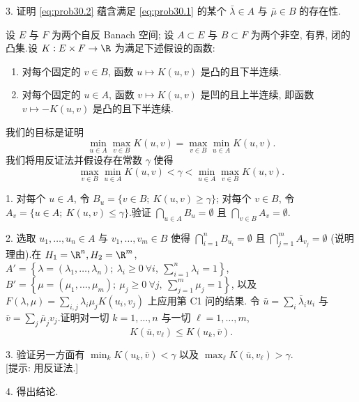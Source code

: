 \begin{problem}[第 3, 5 章]
3. 证明 \eqref{eq:prob30.2} 蕴含满足 \eqref{eq:prob30.1} 的某个 $\bar\lambda\in A$
与 $\bar\mu\in B$ 的存在性.


设 $E$ 与 $F$ 为两个自反 Banach 空间; 设 $A\subset E$ 与 $B\subset F$ 为两个非空, 有界, 闭的凸集.设 $K:E\times F\to\R$ 为满足下述假设的函数:
\begin{enumerate}[label=(\alph*), itemsep=0.1em]
	\item 对每个固定的 $v\in B$, 函数 $u\mapsto K(u,v)$ 是凸的且下半连续.
	\item 对每个固定的 $u\in A$, 函数 $v\mapsto K(u,v)$ 是凹的且上半连续, 即函数 $v\mapsto-K(u,v)$ 是凸的且下半连续.
\end{enumerate}
我们的目标是证明
\begin{equation*}
\min_{u\in A}\max_{v\in B}K(u,v)=\max_{v\in B}\min_{u\in A}K(u,v).
\end{equation*}
我们将用反证法并假设存在常数 $\gamma$ 使得
\begin{equation*}
\max_{v\in B}\min_{u\in A}K(u,v)<\gamma<\min_{u\in A}\max_{v\in B}K(u,v).
\end{equation*}

1. 对每个 $u\in A$, 令 $B_u=\{v\in B;\ K(u,v)\ge\gamma\}$; 对每个 $v\in B$, 令
$A_v=\{u\in A;\ K(u,v)\le\gamma\}$.验证 $\bigcap_{u\in A}B_u=\emptyset$ 且
$\bigcap_{v\in B}A_v=\emptyset$.

2. 选取 $u_1,\dots,u_n\in A$ 与 $v_1,\dots,v_m\in B$ 使得 $\bigcap_{i=1}^nB_{u_i}=\emptyset$
且 $\bigcap_{j=1}^mA_{v_j}=\emptyset$ (说明理由).在 $H_1=\R^n,H_2=\R^m$,
$A'=\left\{\lambda=(\lambda_1,\dots,\lambda_n);\ \lambda_i\ge0\ \forall i,\ \sum_{i=1}^n\lambda_i=1\right\}$,
$B'=\left\{\mu=(\mu_1,\dots,\mu_m);\ \mu_j\ge0\ \forall j,\ \sum_{j=1}^m\mu_j=1\right\}$,
以及 $F(\lambda,\mu)=\sum_{i,j}\lambda_i\mu_jK(u_i,v_j)$ 上应用第 C1 问的结果.
令 $\bar u=\sum_i\bar\lambda_iu_i$ 与 $\bar v=\sum_j\bar\mu_jv_j$.证明对一切
$k=1,\dots,n$ 与一切 $\ell=1,\dots,m$,
\begin{equation*}
K(\bar u,v_\ell)\le K(u_k,\bar v).
\end{equation*}

3. 验证另一方面有 $\min_k K(u_k,\bar v)<\gamma$ 以及 $\max_\ell K(\bar u,v_\ell)>\gamma$.\\
{[提示: 用反证法.]}

4. 得出结论.
\end{problem}
